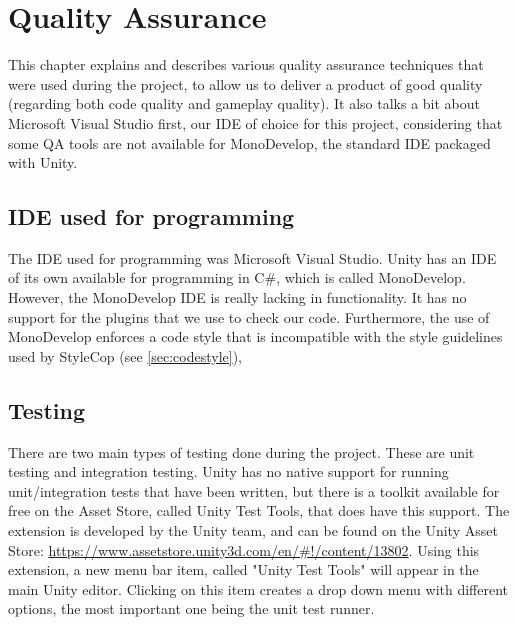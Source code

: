 \chapter{Quality Assurance} \label{cha:qa}
	This chapter explains and describes various quality assurance techniques 
	that were used during the project, to allow us to deliver a product of 
	good quality (regarding both code quality and gameplay quality). It also
	talks a bit about Microsoft Visual Studio first, our IDE of choice for
	this project, considering that some QA tools are not available for
	MonoDevelop, the standard IDE packaged with Unity.
	
	\section{IDE used for programming} \label{sec:ide}
		The IDE used for programming was Microsoft Visual Studio. Unity has an IDE
		of its own available for programming in C\#, which is called MonoDevelop.
		However, the MonoDevelop IDE is really lacking in functionality. It has no
		support for the plugins that we use to check our code. Furthermore, the use
		of MonoDevelop enforces a code style that is incompatible with the style 
		guidelines used by StyleCop (see \ref{sec:codestyle}), 
	
	\section{Testing} \label{sec:testing}
		There are two main types of testing done during the project. These are
		unit testing and integration testing. Unity has no native support for
		running unit\slash integration tests that have been written, but there is 
		a toolkit available for free on the Asset Store, called Unity Test Tools, 
		that does have this support. The extension is developed by the Unity team, 
		and can be found on the Unity Asset Store: 
		\url{https://www.assetstore.unity3d.com/en/#!/content/13802}.
		Using this extension, a new menu bar item, called "Unity Test Tools"
		will appear in the main Unity editor. Clicking on this item creates a drop
		down menu with different options, the most important one being the unit test
		runner.
		
